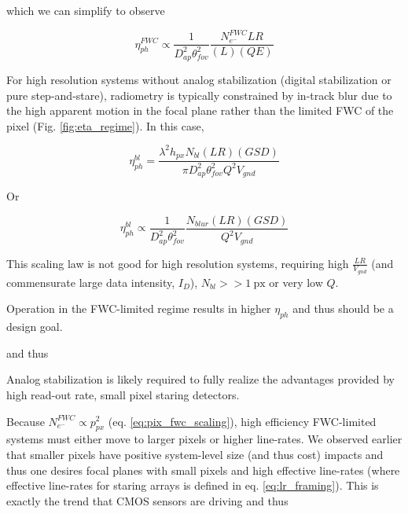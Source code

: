 \documentclass[10pt,journal]{IEEEtran}  %
\begin{document}
which we can simplify to observe

\begin{equation}
    \label{eq:eta_fwc_scaling}
    \eta_{ph}^{FWC} \propto \frac{1}{D_{ap}^2 \theta_{fov}^2} \frac{N_{e^-}^{FWC} LR}{(L)(QE)}
\end{equation}

For high resolution systems without analog stabilization (digital stabilization or pure step-and-stare), radiometry is typically constrained by in-track blur due to the high apparent motion in the focal plane rather than the limited FWC of the pixel (Fig. \ref{fig:eta_regime}).  In this case,

\begin{equation}
    \label{eq:eta_ph_blur}
    \eta_{ph}^{bl} = \frac{\lambda^2 h_{px}N_{bl}(LR)(GSD)}{\pi D_{ap}^2\theta_{fov}^2 Q^2 V_{gnd}}
\end{equation}

Or 

\begin{equation}
    \label{eq:eta_blur_scaling}
    \eta_{ph}^{bl} \propto \frac{1}{D_{ap}^2 \theta_{fov}^2} \frac{N_{blur} (LR) (GSD)}{Q^2 V_{gnd}}
\end{equation}

This scaling law is not good for high resolution systems, requiring high $\frac{LR}{V_{gnd}}$ (and commensurate large data intensity, $I_{D}$), $N_{bl} >> 1 \: \textrm{px}$ or very low $Q$.

\begin{observation}
Operation in the FWC-limited regime results in higher $\eta_{ph}$ and thus should be a design goal.
\end{observation}
and thus
\begin{observation}
Analog stabilization is likely required to fully realize the advantages provided by high read-out rate, small pixel staring detectors.
\end{observation}

Because $N_{e^-}^{FWC} \propto p_{px}^2$ (eq. \ref{eq:pix_fwc_scaling}), high efficiency FWC-limited systems must either move to larger pixels or higher line-rates.  We observed earlier that smaller pixels have positive system-level size (and thus cost) impacts and thus one desires focal planes with small pixels and high effective line-rates (where effective line-rates for staring arrays is defined in eq. \ref{eq:lr_framing}).  This is exactly the trend that CMOS sensors are driving and thus
\end{document}

